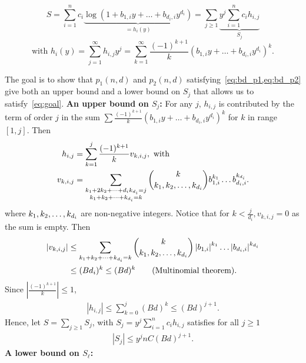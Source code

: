 \documentclass[a4paper, 11pt,dvipsnames]{article}
\newcommand\abs[1]{\left|#1\right|}
\begin{document}
                  \begin{equation*} S = \sum_{i=1}^n c_i \underbrace{\log \left( 1+ b_{1,i} y + \dots + b_{d_i,i} y^{d_i} \right) }_{= h_i(y)} = \sum_{j \ge 1 }
                    \underbrace{y^j \sum_{i=1}^n c_i h_{i,j}}_{S_j} \end{equation*} \begin{equation*} \text{with }h_i(y) = \sum_{j=1}^\infty h_{i,j}y^j =
                  \sum_{k=1}^\infty  \frac{(-1)^{k+1}}{k} \left( b_{1,i} y + \dots + b_{d_i,i} y^{d_i} \right)^k.  \end{equation*}

      The goal is to show that $p_1(n,d)$ and $p_2(n,d)$ satisfying~\cref{eq:bd_p1,eq:bd_p2} give both an upper bound and a lower bound on $S_j$ that allows us to satisfy~\cref{eq:goal}.
      \newline \textbf{An upper bound on $S_j$:} \newline For any $j$, $h_{i,j}$ is contributed by the term of order $j$ in the sum $\sum \frac{(-1)^{k+1}}{k} \left( b_{1,i} y +
    \dots + b_{d_i,i} y^{d_i} \right)^k $ for $k$ in range $\left[1, j\right]$. Then \begin{align*} h_{i,j} &= \sum_{k=1}^j \frac{(-1)^{k+1}}{k} v_{k,i,j},
      \text{ with } \\ v_{k,i,j} &= \sum_{\substack{k_1 + 2 k_2 + \dots + d_i k_{d_i} = j \\ k_{1}+k_{2}+\dots+k_{d_i} = k }} \binom{k}{k_{1},k_{2},\dots,k_{d_i}}
    b_{1,i}^{k_1} \dots b_{d_i,i}^{k_{d_i}}.  \end{align*}
where $k_{1},k_{2},\dots,k_{d_i}$ are non-negative integers. Notice that for $k < \frac{j}{d_i}, v_{k,i,j}= 0$ as the sum is empty. Then \begin{align*} \abs{v_{k,i,j}} &\le \sum_{\lstp{k}{d_i} = k } \binom{k}{\lst{k}{d_i} } \left| b_{1,i} \right|^{k_1} \dots \left| b_{d_i,i} \right|^{k_{d_i}} \\ & \le (B d_i)^k \le (B d )^k \tag{Multinomial theorem}.  \end{align*}
Since $\left| \frac{(-1)^{k+1}}{k} \right| \le 1$, \begin{align*} \left| h_{i,j}\right| \le \sum_{k = 0 }^j (Bd)^k \le (Bd)^{j+1}.  \end{align*}
Hence, let $S = \sum_{j \ge 1} S_j$, with $S_j = y^j \sum_{i=1}^n c_i h_{i,j}$ satisfies for all $j \ge 1$ \begin{align*} \left| S_j \right| \le y^j n
            C (Bd)^{j+1}.  \end{align*} \newline \textbf{A lower bound on $S_\ell$:} \newline 
\end{document}

